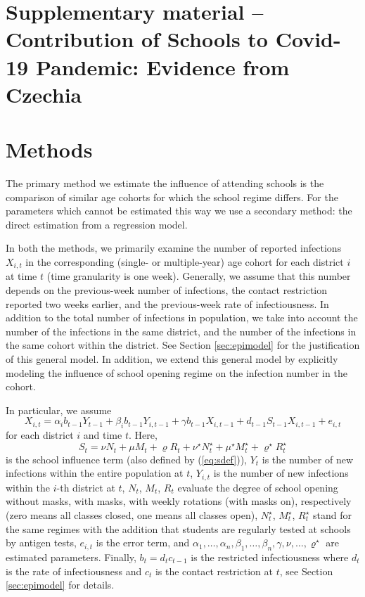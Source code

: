 \documentclass[fleqn,10pt]{wlscirep}
\begin{document}

%



\newpage

\appendix 
\section*{Supplementary material -- Contribution of Schools to Covid-19 Pandemic: Evidence from Czechia}



\section{Methods}
\label{sec:methodsdetail}

The primary method we estimate the influence of attending schools is the comparison of similar age cohorts for which the school regime differs. For the parameters which cannot be estimated this way we use a secondary method: the direct estimation from a regression model. 

In both the methods, we primarily examine the number of reported infections $X_{i,t}$ in the corresponding (single- or multiple-year) age cohort for each district $i$ at time $t$ (time granularity is one week). Generally, we assume that this number depends on the previous-week number of infections, the contact restriction reported two weeks earlier, and the previous-week rate of infectiousness. In addition to the total number of infections in population, we take into account the number of the infections in the same district, and the number of the infections in the same cohort within the district. See Section \ref{sec:epimodel} for the justification of this general model. In addition, we extend this general model by explicitly modeling the influence of school opening regime on the infection number in the cohort. 

In particular, we assume
\begin{equation}
X_{i,t} = \alpha_i b_{t-1} Y_{t-1} + \beta_i b_{t-1} Y_{i,t-1} + \gamma b_{t-1} X_{i,t-1}
+ d_{t-1} S_{t-1} X_{i,t-1} + e_{i,t}
\label{eq:x}
\end{equation}
for each district $i$ and time $t$. Here, 
$$
S_t = \nu N_{t} + \mu M_{t} + \varrho R_{t} + \nu^\star N^\star_{t}
+ \mu^\star M^{\star}_{t} + \varrho^\star R^\star_{t} 
$$
is the school influence term (also defined by (\ref{eq:sdef})),
$Y_t$ is the number of new infections within the entire population at $t$, $Y_{i,t}$ is the number of new infections within the $i$-th district at $t$, $N_t$, $M_t$, $R_t$ evaluate the degree of school opening without masks, with masks, with weekly rotations (with masks on), respectively (zero means all classes closed, one means all classes open), $N^\star_t$, $M^\star_t$, $R^\star_t$ stand for the same regimes with the addition that students are regularly tested at schools by antigen tests, $e_{i,t}$ is the error term, and $\alpha_1,\dots,\alpha_n,\beta_1,\dots,\beta_n,\gamma,\nu,\dots,\varrho^\star$ are estimated parameters. Finally, $b_t = d_{t} c_{t-1}$ is the restricted infectiousness where $d_t$ is the rate of infectiousness and $c_t$ is the contact restriction at $t$, see Section \ref{sec:epimodel} for details.
\end{document}
